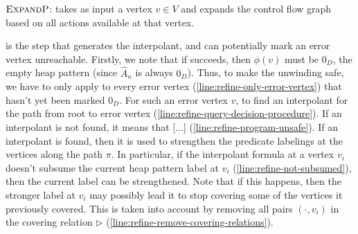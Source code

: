\begin{algorithm}[ht]


  \caption{$\textsc{ExpandP}$: takes as input a vertex $v \in V$ and expands the control flow graph based on all actions available at that vertex.}
  \label{alg:heap-expand}
\end{algorithm}

 is the step that generates the interpolant, and can potentially mark an error vertex unreachable. Firstly, we note that if  succeeds, then $\phi(v)$ must be $0_D$, the empty heap pattern (since $\hat{A}_n$ is always $0_D$). Thus, to make the unwinding safe, we have to only apply  to every error vertex (\autoref{line:refine-only-error-vertex}) that hasn't yet been marked $0_D$. For such an error vertex $v$,  \seplearner to find an interpolant for the path from root to error vertex (\autoref{line:refine-query-decision-procedure}). If an interpolant is not found, it means that [...] (\autoref{line:refine-program-unsafe}). If an interpolant is found, then it is used to strengthen the predicate labelings at the vertices along the path $\pi$. In particular, if the interpolant formula at a vertex $v_i$ doesn't subsume the current heap pattern label at $v_i$ (\autoref{line:refine-not-subsumed}), then the current label can be strengthened. Note that if this happens, then the stronger label at $v_i$ may possibly lead it to stop covering some of the vertices it previously covered. This is taken into account by removing all pairs $(\cdot, v_i)$ in the covering relation $\rhd$ (\autoref{line:refine-remove-covering-relations}).


